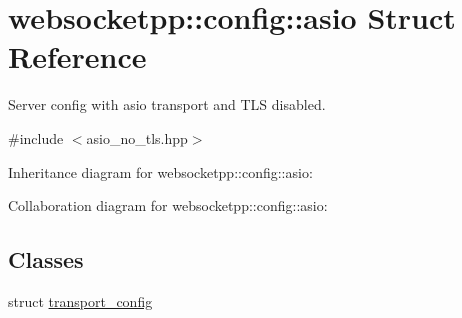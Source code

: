 \hypertarget{structwebsocketpp_1_1config_1_1asio}{}\section{websocketpp\+:\+:config\+:\+:asio Struct Reference}
\label{structwebsocketpp_1_1config_1_1asio}


Server config with asio transport and T\+LS disabled.  




{\ttfamily \#include $<$asio\+\_\+no\+\_\+tls.\+hpp$>$}



Inheritance diagram for websocketpp\+:\+:config\+:\+:asio\+:


Collaboration diagram for websocketpp\+:\+:config\+:\+:asio\+:
\subsection*{Classes}
\begin{DoxyCompactItemize}
\item 
struct \mbox{\hyperlink{structwebsocketpp_1_1config_1_1asio_1_1transport__config}{transport\+\_\+config}}
\end{DoxyCompactItemize}
